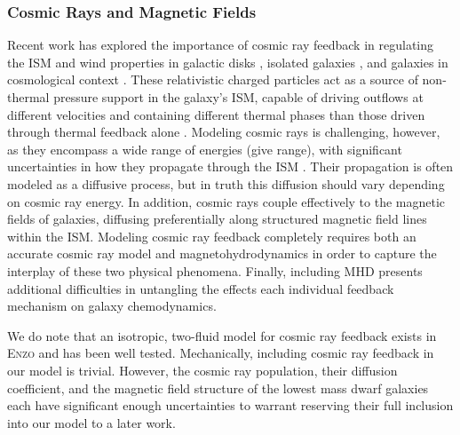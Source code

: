 \documentclass[twocolumn]{aastex61}
\begin{document}
\subsubsection{Cosmic Rays and Magnetic Fields}
Recent work has explored the importance of cosmic ray feedback in regulating the ISM and wind properties in galactic disks \citep{Hanasz2013,GirichidisCR,Simpson2016,Farber2017}, isolated galaxies \citep{SalemBryanCorlies,Salem2015,Pakmor2016,Ruszkowski2017}, and galaxies in cosmological context \citep{SalemBryanHummels}. These relativistic charged particles act as a source of non-thermal pressure support in the galaxy's ISM, capable of driving outflows at different velocities and containing different thermal phases than those driven through thermal feedback alone \citep{SalemBryanCorlies}. Modeling cosmic rays is challenging, however, as they encompass a wide range of energies (give range), with significant uncertainties in how they propagate through the ISM \citep[e.g.][]{Wiener2017}. Their propagation is often modeled as a diffusive process, but in truth this diffusion should vary depending on cosmic ray energy. In addition, cosmic rays couple effectively to the magnetic fields of galaxies, diffusing preferentially along structured magnetic field lines within the ISM. Modeling cosmic ray feedback completely requires both an accurate cosmic ray model and magnetohydrodynamics in order to capture the interplay of these two physical phenomena. Finally, including MHD presents additional difficulties in untangling the effects each individual feedback mechanism on galaxy chemodynamics.

We do note that an isotropic, two-fluid model for cosmic ray feedback exists in  \textsc{Enzo} \citep{SalemBryan2014,Salem2015} and has been well tested. Mechanically, including cosmic ray feedback in our model is trivial. However, the cosmic ray population, their diffusion coefficient, and the magnetic field structure of the lowest mass dwarf galaxies each have significant enough uncertainties to warrant reserving their full inclusion into our model to a later work.

\end{document}

